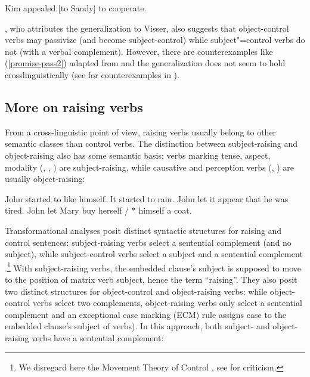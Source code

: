 \begin{exe}
\ex Kim appealed [to Sandy] to cooperate. \label{to}
\end{exe}


 
\citet[]{Bresnan1982}, who attributes the generalization to Visser, also suggests that
object-control verbs may passivize (and become subject-control) while subject"=control verbs do not
(with a verbal complement). However, there are counterexamples like (\ref{promise-pass2}) adapted
from \citet[]{JB1976a-u} and the generalization does not seem to hold crosslinguistically
(see  for counterexamples in ).

\eal
{}\label{persuade-pass}
\label{promise-pass}
\label{promise-pass2}
\zl

 
\subsection{More on raising verbs}
\label{sec-more-on-raising-verbs}

From a cross-linguistic point of view, raising verbs usually belong to other semantic classes than
control verbs. The distinction between subject-raising and object-raising also has some semantic
basis: verbs marking tense, aspect, modality (, , ) are
subject-raising, while causative and perception verbs (, ) are usually
object-raising:

\eal
\ex John started to like himself.
\ex It started to rain.
\ex John let it appear that he was tired.
\ex John let Mary buy herself / * himself a coat.
\zl
	

Transformational analyses posit distinct syntactic structures for raising and control sentences:
subject-raising verbs select a sentential complement (and no subject), while subject-control verbs
select a subject and a sentential complement \parencites[\iaddpages]{Postal1974}[\iaddpages]{Chomsky81a}.\footnote{We disregard here the Movement Theory of Control \citep{Hornstein99a-u}, see  for criticism.}
With subject-raising
verbs, the embedded clause's subject is supposed to move to the position of matrix verb subject,
hence the  term ``raising''. They also posit two distinct structures for object-control and
object-raising verbs: while object-control verbs select two complements, object-raising verbs only
select a sentential complement and an exceptional case marking (ECM) rule assigns case to the
embedded clause's subject of  verbs).
In this approach, both subject- and object-raising verbs have a sentential complement:
	
